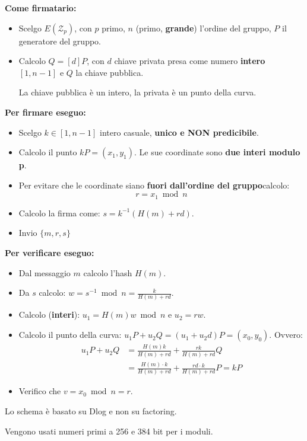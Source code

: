 \begin{definition}\label{def:ecdsa}
\textbf{Come firmatario:}
\begin{itemize}
    \item Scelgo $E(\mathcal{Z}_p)$, con $p$ primo, $n$ (primo, \textbf{grande}) l'ordine del gruppo, $P$ il generatore del gruppo.
    \item Calcolo $Q=[d]P$, con $d$ chiave privata presa come numero \textbf{intero} $[1,n-1]$ e $Q$ la chiave pubblica.\\
    \begin{remark}
    La chiave pubblica è un intero, la privata è un punto della curva.
    \end{remark}
\end{itemize}
\textbf{Per firmare eseguo:}
\begin{itemize}
    \item Scelgo $k\in[1,n-1]$ intero casuale, \textbf{unico e NON predicibile}.
    \item Calcolo il punto $kP=(x_1,y_1)$. Le sue coordinate sono \textbf{due interi modulo p}.
    \item Per evitare che le coordinate siano \textbf{fuori dall'ordine del gruppo}\footnotemark calcolo:
    \[r=x_1\bmod n\]
    \item Calcolo la firma come: $s=k^{-1}(H(m)+rd)$.
    \item Invio $\{m,r,s\}$
\end{itemize}
\textbf{Per verificare eseguo:}
\begin{itemize}
    \item Dal messaggio $m$ calcolo l'hash $H(m)$.
    \item Da $s$ calcolo: $w=s^{-1}\bmod n=\frac{k}{H(m)+rd}$.
    \item Calcolo (\textbf{interi}): $u_1=H(m)w\bmod n$ e $u_2=rw$.
    \item Calcolo il punto della curva: $u_1P+u_2Q=(u_1+u_2d)P=(x_0,y_0)$. Ovvero:
    \begin{equation*}
        \begin{aligned}
            u_1P+u_2Q&=\frac{H(m)k}{H(m)+rd}+\frac{rk}{H(m)+rd}Q\\
            &=\frac{H(m)\cdot k}{H(m)+rd}+\frac{rd\cdot k}{H(m)+rd}P=kP
        \end{aligned}
    \end{equation*}
    \item Verifico che $v=x_0\bmod n=r$.
\end{itemize}
\begin{remark}
Lo schema è basato su Dlog e non su factoring.
\end{remark}
Vengono usati numeri primi a 256 e 384 bit per i moduli.
\end{definition}
